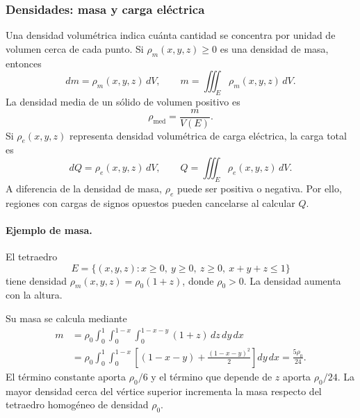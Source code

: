 \subsubsection{Densidades: masa y carga eléctrica}

Una densidad volumétrica indica cuánta cantidad se concentra por unidad de volumen cerca de cada punto. Si $\rho_m(x,y,z)\geq0$ es una densidad de masa, entonces
\[
dm=\rho_m(x,y,z)\,dV,
\qquad
m=\iiint_E\rho_m(x,y,z)\,dV.
\]
La densidad media de un sólido de volumen positivo es
\[
\rho_{\mathrm{med}}=\frac{m}{V(E)}.
\]
Si $\rho_e(x,y,z)$ representa densidad volumétrica de carga eléctrica, la carga total es
\[
dQ=\rho_e(x,y,z)\,dV,
\qquad
Q=\iiint_E\rho_e(x,y,z)\,dV.
\]
A diferencia de la densidad de masa, $\rho_e$ puede ser positiva o negativa. Por ello, regiones con cargas de signos opuestos pueden cancelarse al calcular $Q$.

\paragraph{Ejemplo de masa.} El tetraedro
\[
E=\{(x,y,z):x\geq0,\ y\geq0,\ z\geq0,\ x+y+z\leq1\}
\]
tiene densidad $\rho_m(x,y,z)=\rho_0(1+z)$, donde $\rho_0>0$. La densidad aumenta con la altura.

\begingroup
\shorthandoff{>}
\begin{center}
\end{center}
\endgroup

Su masa se calcula mediante
\begin{align*}
m
&=\rho_0\int_0^1\int_0^{1-x}\int_0^{1-x-y}(1+z)\,dz\,dy\,dx\\
&=\rho_0\int_0^1\int_0^{1-x}
\left[(1-x-y)+\frac{(1-x-y)^2}{2}\right]dy\,dx
=\frac{5\rho_0}{24}.
\end{align*}
El término constante aporta $\rho_0/6$ y el término que depende de $z$ aporta $\rho_0/24$. La mayor densidad cerca del vértice superior incrementa la masa respecto del tetraedro homogéneo de densidad $\rho_0$.

